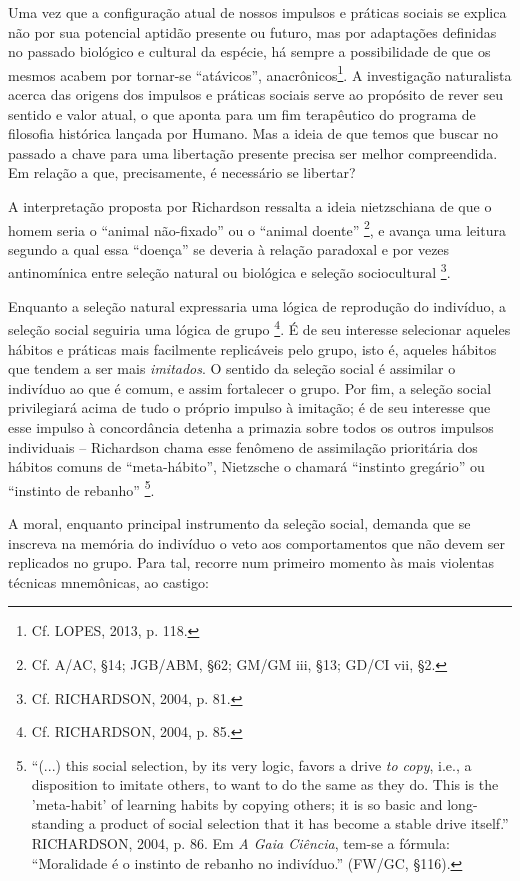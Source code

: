 \documentclass[
	12pt,				%
	openright,			%
	oneside,			%
	a4paper,			%
	english,			%
	french,				%
	spanish,			%
	brazil				%
	]{abntex2}
\begin{document}
Uma vez que a configuração atual de nossos impulsos e práticas sociais se explica não por sua potencial aptidão presente ou futuro, mas por adaptações definidas no passado biológico e cultural da espécie, há sempre a possibilidade de que os mesmos acabem por tornar-se “atávicos”, anacrônicos\footnote{Cf. LOPES, 2013, p. 118.}. A investigação naturalista acerca das origens dos impulsos e práticas sociais serve ao propósito de rever seu sentido e valor atual, o que aponta para um fim terapêutico do programa de filosofia histórica lançada por Humano. Mas a ideia de que temos que buscar no passado a chave para uma libertação presente precisa ser melhor compreendida. Em relação a que, precisamente, é necessário se libertar? 

A interpretação proposta por Richardson ressalta a ideia nietzschiana de que o homem seria o “animal não-fixado” ou o “animal doente”
\footnote{Cf. A/AC, §14; JGB/ABM, §62; GM/GM iii, §13; GD/CI vii, §2.}, 
e avança uma leitura segundo a qual essa “doença” se deveria à relação paradoxal e por vezes antinomínica entre seleção natural ou biológica e seleção sociocultural
\footnote{Cf. RICHARDSON, 2004, p. 81.}.

	Enquanto a seleção natural expressaria uma lógica de reprodução do indivíduo, a seleção social seguiria uma lógica de grupo
\footnote{Cf. RICHARDSON, 2004, p. 85.}. 
É de seu interesse selecionar aqueles hábitos e práticas mais facilmente replicáveis pelo grupo, isto é, aqueles hábitos que tendem a ser mais \textit{imitados}. O sentido da seleção social é assimilar o indivíduo ao que é comum, e assim fortalecer o grupo. Por fim, a seleção social privilegiará acima de tudo o próprio impulso à imitação; é de seu interesse que esse impulso à concordância detenha a primazia sobre todos os outros impulsos individuais – Richardson chama esse fenômeno de assimilação prioritária dos hábitos comuns de “meta-hábito”, Nietzsche o chamará “instinto gregário” ou “instinto de rebanho”
\footnote{“(...) this social selection, by its very logic, favors a drive \textit{to copy}, i.e., a disposition to imitate others, to want to do the same as they do. This is the 'meta-habit' of learning habits by copying others; it is so basic and long-standing a product of social selection that it has become a stable drive itself.” RICHARDSON, 2004, p. 86. Em \textit{A Gaia Ciência}, tem-se a fórmula: “Moralidade é o instinto de rebanho no indivíduo.” (FW/GC, §116).}. 
	
	A moral, enquanto principal instrumento da seleção social, demanda que se inscreva na memória do indivíduo o veto aos comportamentos que não devem ser replicados no grupo. Para tal, recorre num primeiro momento às mais violentas técnicas mnemônicas, ao castigo:
\end{document}
